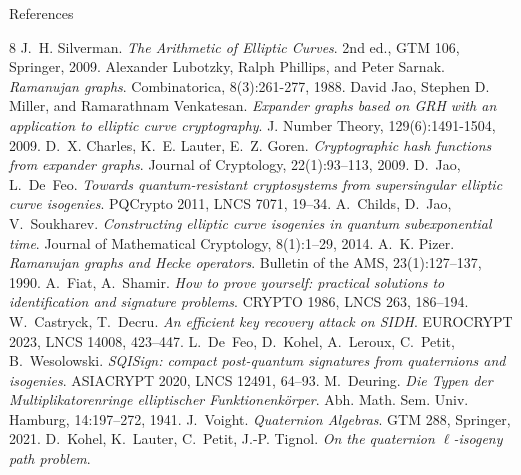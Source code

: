\documentclass[10pt,aspectratio=169]{beamer}
\begin{document}

\begin{frame}[allowframebreaks]{References}
  \small
  \begin{thebibliography}{8}
      J.~H. Silverman.
      \emph{The Arithmetic of Elliptic Curves}.
      2nd ed., GTM 106, Springer, 2009.
      Alexander Lubotzky, Ralph Phillips, and Peter Sarnak. 
      \emph{Ramanujan graphs}.
      Combinatorica, 8(3):261-277, 1988.
      David Jao, Stephen D. Miller, and Ramarathnam Venkatesan.
      \emph{Expander graphs based on GRH with an application to elliptic curve cryptography}. 
      J. Number Theory, 129(6):1491-1504, 2009.
      D.~X. Charles, K.~E. Lauter, E.~Z. Goren.
      \emph{Cryptographic hash functions from expander graphs}.
      Journal of Cryptology, 22(1):93--113, 2009.
      D.~Jao, L.~De~Feo.
      \emph{Towards quantum-resistant cryptosystems from supersingular elliptic curve isogenies}.
      PQCrypto 2011, LNCS 7071, 19--34.
      A.~Childs, D.~Jao, V.~Soukharev.
      \emph{Constructing elliptic curve isogenies in quantum subexponential time}.
      Journal of Mathematical Cryptology, 8(1):1--29, 2014.
      A.~K. Pizer.
      \emph{Ramanujan graphs and Hecke operators}.
      Bulletin of the AMS, 23(1):127--137, 1990.
      A.~Fiat, A.~Shamir.
      \emph{How to prove yourself: practical solutions to identification and signature problems}.
      CRYPTO 1986, LNCS 263, 186--194.
      W.~Castryck, T.~Decru.
      \emph{An efficient key recovery attack on SIDH}.
      EUROCRYPT 2023, LNCS 14008, 423--447.
      L.~De~Feo, D.~Kohel, A.~Leroux, C.~Petit, B.~Wesolowski.
      \emph{SQISign: compact post-quantum signatures from quaternions and isogenies}.
      ASIACRYPT 2020, LNCS 12491, 64--93.
      M.~Deuring.
      \emph{Die Typen der Multiplikatorenringe elliptischer Funktionenk\"orper}.
      Abh. Math. Sem. Univ. Hamburg, 14:197--272, 1941.
      J.~Voight.
      \emph{Quaternion Algebras}.
      GTM 288, Springer, 2021.
      D.~Kohel, K.~Lauter, C.~Petit, J.-P. Tignol.
      \emph{On the quaternion $\ell$-isogeny path problem}.

\end{thebibliography}
\end{frame}
\end{document}
